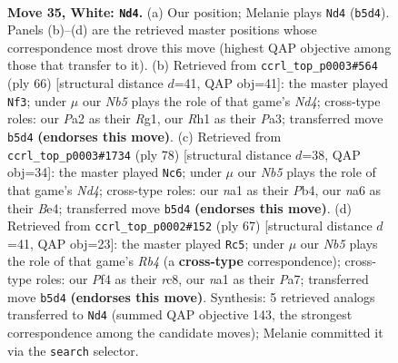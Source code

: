 \documentclass[11pt]{article}
\begin{document}
\clearpage

\begin{figure}[p]\centering
\begin{subfigure}{0.46\textwidth}\centering
\resizebox{\linewidth}{!}{%
\newchessgame
\chessboard[
  setfen={5r2/1ppkp2p/n5p1/pN6/5P1P/2P5/P4PK1/n1B4R w - - 15 35},
  showmover=false,
  pgfstyle=straightmove, color=movearrow, markmove={b5-d4}
]}
\caption{}
\end{subfigure}\hfill
\begin{subfigure}{0.46\textwidth}\centering
\resizebox{\linewidth}{!}{%
\newchessgame
\chessboard[
  setfen={7r/pp2pk2/4p2P/3p4/3N1P1P/PP2n3/1KP5/6R1 w - - 5 34},
  showmover=false,
  pgfstyle=straightmove, color=movearrow, markmove={d4-f3}
]}
\caption{}
\end{subfigure}
\\[4pt]
\begin{subfigure}{0.46\textwidth}\centering
\resizebox{\linewidth}{!}{%
\newchessgame
\chessboard[
  setfen={1b3k2/p4p2/1p2p2p/1P5n/PP1NB3/8/r4PP1/4RK2 w - - 4 40},
  showmover=false,
  pgfstyle=straightmove, color=movearrow, markmove={d4-c6}
]}
\caption{}
\end{subfigure}\hfill
\begin{subfigure}{0.46\textwidth}\centering
\resizebox{\linewidth}{!}{%
\newchessgame
\chessboard[
  setfen={2R5/p5pp/1p1k1n2/1r2p3/8/1P4P1/P2NKP1P/8 b - - 2 34},
  showmover=false,
  pgfstyle=straightmove, color=movearrow, markmove={b5-c5}
]}
\caption{}
\end{subfigure}
\caption{\textbf{Move 35, White: \texttt{Nd4}.} (a) Our position; Melanie plays \texttt{Nd4} (\texttt{b5d4}). Panels (b)--(d) are the retrieved master positions whose correspondence most drove this move (highest QAP objective among those that transfer to it). (b) Retrieved from \texttt{ccrl\_top\_p0003\#564} (ply 66) [structural distance $d$=41, QAP obj=41]: the master played \texttt{Nf3}; under $\mu$ our \emph{Nb5} plays the role of that game's \emph{Nd4}; cross-type roles: our \emph{P}a2 as their \emph{R}g1, our \emph{R}h1 as their \emph{P}a3; transferred move \texttt{b5d4} \textbf{(endorses this move)}. (c) Retrieved from \texttt{ccrl\_top\_p0003\#1734} (ply 78) [structural distance $d$=38, QAP obj=34]: the master played \texttt{Nc6}; under $\mu$ our \emph{Nb5} plays the role of that game's \emph{Nd4}; cross-type roles: our \emph{n}a1 as their \emph{P}b4, our \emph{n}a6 as their \emph{B}e4; transferred move \texttt{b5d4} \textbf{(endorses this move)}. (d) Retrieved from \texttt{ccrl\_top\_p0002\#152} (ply 67) [structural distance $d$=41, QAP obj=23]: the master played \texttt{Rc5}; under $\mu$ our \emph{Nb5} plays the role of that game's \emph{Rb4} (a \textbf{cross-type} correspondence); cross-type roles: our \emph{P}f4 as their \emph{r}c8, our \emph{n}a1 as their \emph{P}a7; transferred move \texttt{b5d4} \textbf{(endorses this move)}. Synthesis: 5 retrieved analogs transferred to \texttt{Nd4} (summed QAP objective 143, the strongest correspondence among the candidate moves); Melanie committed it via the \texttt{search} selector.}
\label{fig:thought-m68}
\end{figure}
\end{document}
